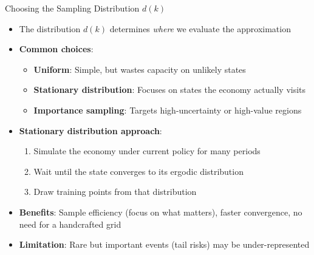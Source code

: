 \documentclass[10pt,english,aspectratio=169]{beamer}
\begin{document}
\begin{frame}{Choosing the Sampling Distribution $d(k)$}
\begin{itemize}
  \item The distribution $d(k)$ determines \emph{where} we evaluate the approximation
  \medskip
  \item \textbf{Common choices}:
    \begin{itemize}
      \item \textbf{Uniform}: Simple, but wastes capacity on unlikely states
      \item \textbf{Stationary distribution}: Focuses on states the economy actually visits
      \item \textbf{Importance sampling}: Targets high-uncertainty or high-value regions
    \end{itemize}
  \medskip
  \item \textbf{Stationary distribution approach}:
    \begin{enumerate}
      \item Simulate the economy under current policy for many periods
      \item Wait until the state converges to its ergodic distribution
      \item Draw training points from that distribution
    \end{enumerate}
  \medskip
  \item \textbf{Benefits}: Sample efficiency (focus on what matters), faster convergence, no need for a handcrafted grid
  \item \textbf{Limitation}: Rare but important events (tail risks) may be under-represented
\end{itemize}
\end{frame}
\end{document}
